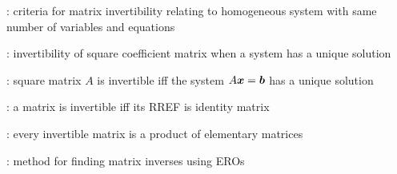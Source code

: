\item {}: criteria for matrix invertibility relating to homogeneous system with same number of variables and equations
\item {}: invertibility of square coefficient matrix when a system has a unique solution
\item {}: square matrix \(A\) is invertible iff the system \(A\vb*{x}=\vb*{b}\) has a unique solution
\item {}: a matrix is invertible iff its RREF is identity matrix
\item {}: every invertible matrix is a product of elementary matrices
\item {}: method for finding matrix inverses using EROs
